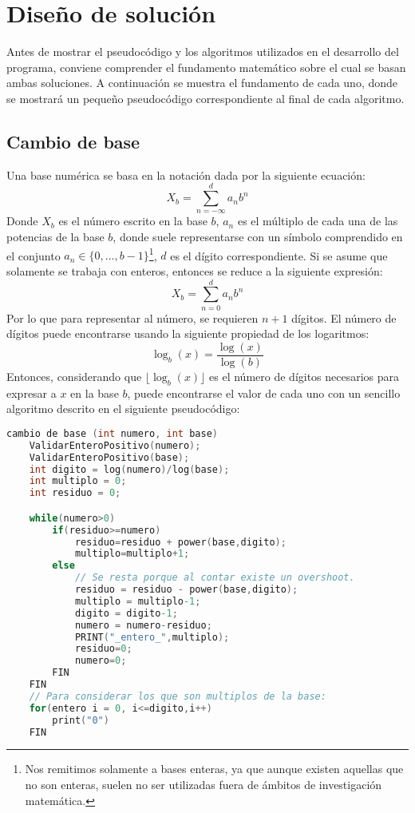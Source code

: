 \documentclass[conference]{IEEEtran}
\begin{document}
\section{Diseño de solución}
Antes de mostrar el pseudocódigo y los algoritmos utilizados en el desarrollo 
del programa, conviene comprender el fundamento matemático sobre el cual se basan
ambas soluciones. A continuación se muestra el fundamento de cada uno, donde se mostrará
un pequeño pseudocódigo correspondiente al final de cada algoritmo.
    \subsection{Cambio de base}
        Una base numérica se basa en la notación dada por la siguiente ecuación:
        \begin{equation*}
            X_b = \sum_{n=-\infty}^{d}a_nb^n
        \end{equation*}
        Donde $X_b$ es el número escrito en la base $b$, $a_n$ es el múltiplo
        de cada una de las potencias de la base $b$, donde suele representarse con un símbolo
        comprendido en el conjunto $a_n \in \{0,...,b-1\}$\footnote{Nos remitimos solamente a bases enteras, ya que aunque existen aquellas que no son enteras, suelen no ser utilizadas fuera de ámbitos de investigación matemática.},
        $d$ es el dígito correspondiente. Si se asume que solamente se trabaja con enteros, entonces se reduce a la siguiente expresión:
        \begin{equation}
            X_b = \sum_{n=0}^{d}a_nb^n
        \end{equation}
        Por lo que para representar al número, se requieren $n+1$ dígitos. El número de dígitos puede encontrarse usando
        la siguiente propiedad de los logaritmos:
        \begin{equation*}
            \log_b(x)=\frac{\log(x)}{\log(b)}
        \end{equation*}
        Entonces, considerando que $\lfloor\log_b(x)\rfloor$ es el número de dígitos
        necesarios para expresar a $x$ en la base $b$, puede encontrarse el valor de cada uno con un sencillo algoritmo descrito en el siguiente pseudocódigo:
        \begin{lstlisting}[style=mystyle,    language=C]
cambio de base (int numero, int base)
    ValidarEnteroPositivo(numero);
    ValidarEnteroPositivo(base);
    int digito = log(numero)/log(base);
    int multiplo = 0;
    int residuo = 0;

    while(numero>0)
        if(residuo>=numero)
            residuo=residuo + power(base,digito);
            multiplo=multiplo+1;
        else
            // Se resta porque al contar existe un overshoot.
            residuo = residuo - power(base,digito);
            multiplo = multiplo-1;
            digito = digito-1;
            numero = numero-residuo;
            PRINT("_entero_",multiplo);
            residuo=0;
            numero=0; 
        FIN
    FIN
    // Para considerar los que son multiplos de la base:
    for(entero i = 0, i<=digito,i++)
        print("0")
    FIN
        \end{lstlisting}
\end{document}
